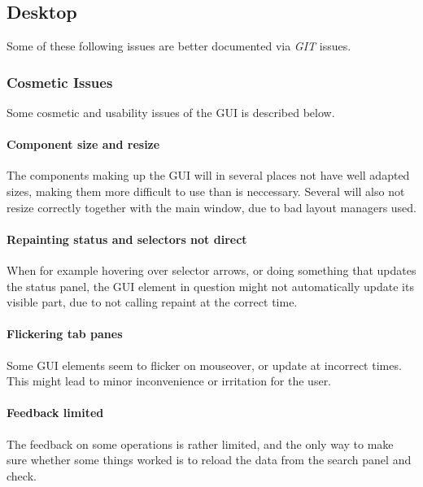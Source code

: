 

\subsection{Desktop}

	Some of these following issues are better documented via \textit{GIT} issues.

\subsubsection{Cosmetic Issues}
	Some cosmetic and usability issues of the GUI is described below.

	\paragraph{ Component size and resize }
		The components making up the GUI will in several places not have well adapted sizes, making them more difficult to use than is neccessary. Several will also not resize correctly together with the main window, due to bad layout managers used.
		
	\paragraph{ Repainting status and selectors not direct  }
		When for example hovering over selector arrows, or doing something that updates the status panel, the GUI element in question might not automatically update its visible part, due to not calling repaint at the correct time.
		
	\paragraph{ Flickering tab panes }
		Some GUI elements seem to flicker on mouseover, or update at incorrect times. This might lead to minor inconvenience or irritation for the user.
		
	\paragraph{ Feedback limited }
		The feedback on some operations is rather limited, and the only way to make sure whether some things worked is to reload the data from the search panel and check.
		

